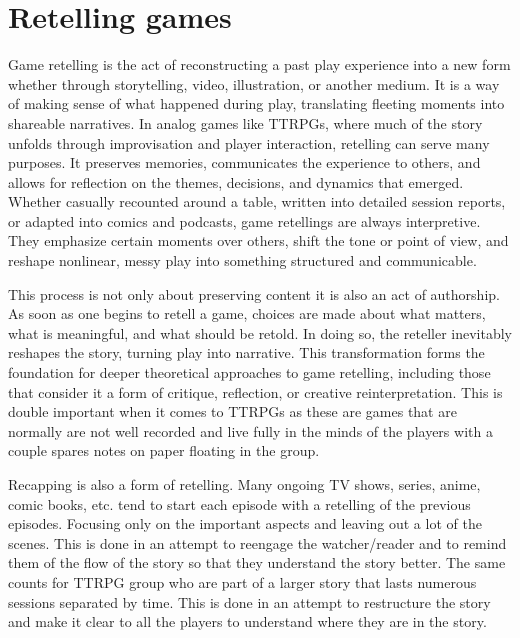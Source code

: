 \section{Retelling games}

Game retelling is the act of reconstructing a past play experience into a new form whether through storytelling, video, illustration, or another medium. It is a way of making sense of what happened during play, translating fleeting moments into shareable narratives. In analog games like TTRPGs, where much of the story unfolds through improvisation and player interaction, retelling can serve many purposes. It preserves memories, communicates the experience to others, and allows for reflection on the themes, decisions, and dynamics that emerged. Whether casually recounted around a table, written into detailed session reports, or adapted into comics and podcasts, game retellings are always interpretive. They emphasize certain moments over others, shift the tone or point of view, and reshape nonlinear, messy play into something structured and communicable.

This process is not only about preserving content it is also an act of authorship. As soon as one begins to retell a game, choices are made about what matters, what is meaningful, and what should be retold. In doing so, the reteller inevitably reshapes the story, turning play into narrative. This transformation forms the foundation for deeper theoretical approaches to game retelling, including those that consider it a form of critique, reflection, or creative reinterpretation. This is double important when it comes to TTRPGs as these are games that are normally are not well recorded and live fully in the minds of the players with a couple spares notes on paper floating in the group.

Recapping is also a form of retelling. Many ongoing TV shows, series, anime, comic books, etc. tend to start each episode with a retelling of the previous episodes. Focusing only on the important aspects and leaving out a lot of the scenes. This is done in an attempt to reengage the watcher/reader and to remind them of the flow of the story so that they understand the story better. The same counts for TTRPG group who are part of a larger story that lasts numerous sessions separated by time. This is done in an attempt to restructure the story and make it clear to all the players to understand where they are in the story.

